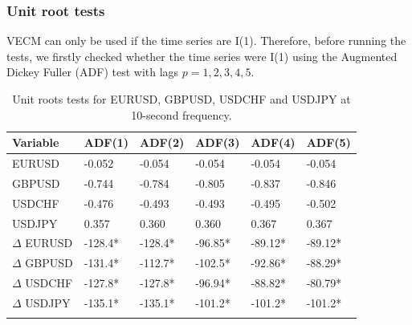\documentclass{beamer}
\begin{document}
%
%
\begin{frame}
\frametitle{Unit root tests}
VECM can only be used if the time series are I(1). Therefore, 
before running the tests, we firstly checked whether the time series were
I(1) using the Augmented Dickey Fuller (ADF) test with lags $p=1,2,3,4,5$.
\begin{table}[ht]
\centering
\tiny
\begin{tabular}{llllll}
\toprule
{Variable} & {ADF(1)} & {ADF(2)} & {ADF(3)} & {ADF(4)} & {ADF(5)}\\ 
\midrule
EURUSD &  -0.052   & -0.054  & -0.054  & -0.054  & -0.054  \\
GBPUSD &  -0.744  & -0.784  & -0.805  & -0.837  & -0.846  \\
USDCHF &  -0.476   & -0.493  & -0.493  & -0.495  & -0.502  \\
USDJPY &  0.357   & 0.360  & 0.360  & 0.367  & 0.367  \\
$\Delta$ EURUSD & -128.4*  & -128.4*  & -96.85* & -89.12*   & -89.12*\\
$\Delta$ GBPUSD & -131.4*  & -112.7*  & -102.5* & -92.86*   & -88.29*\\
$\Delta$ USDCHF & -127.8*  & -127.8*  & -96.94* & -88.82*   & -80.79*\\
$\Delta$ USDJPY & -135.1*  & -135.1*  & -101.2* & -101.2*   & -101.2*\\
\bottomrule
\addlinespace[1ex]
\multicolumn{6}{l}{ \textsuperscript{*} Indicates significance at 1\% level}
\end{tabular}
\caption{Unit roots tests for EURUSD, GBPUSD, USDCHF and USDJPY at 10-second
frequency.}
\label{tab:adf}
\end{table}
\end{frame}
\end{document}
